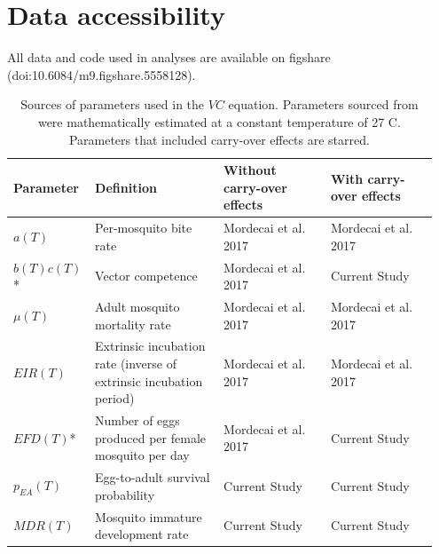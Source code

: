 \documentclass[12pt]{article}
\begin{document}
\section{Data accessibility}
All data and code used in analyses are available on figshare (doi:10.6084/m9.figshare.5558128).

\newpage




\begin{table}[h]
\centering
\begin{tabular}{P{0.15\linewidth}P{0.3\linewidth}P{0.25\linewidth}P{0.25\linewidth}}
\hline
\textbf{Parameter} & \textbf{Definition} & \textbf{Without carry-over effects} & \textbf{With carry-over effects}\\
\hline
$a(T)$ & Per-mosquito bite rate & Mordecai et al. 2017 & Mordecai et al. 2017 \\
$b(T)c(T)$* & Vector competence & Mordecai et al. 2017 & Current Study \\
$\mu(T)$ & Adult mosquito mortality rate & Mordecai et al. 2017 & Mordecai et al. 2017 \\
$EIR(T)$ & Extrinsic incubation rate (inverse of extrinsic incubation period) & Mordecai et al. 2017 & Mordecai et al. 2017 \\
$EFD(T)$* & Number of eggs produced per female mosquito per day & Mordecai et al. 2017 & Current Study \\
$p_{EA}(T)$ & Egg-to-adult survival probability & Current Study & Current Study \\
$MDR(T)$ & Mosquito immature development rate & Current Study & Current Study \\
\hline
\end{tabular}
\caption{Sources of parameters used in the $VC$ equation. Parameters sourced from \citep{mordecai2017} were mathematically estimated at a constant temperature of 27 \degree C. Parameters that included carry-over effects are starred.}
\label{table:traits}
\end{table}
\end{document}
